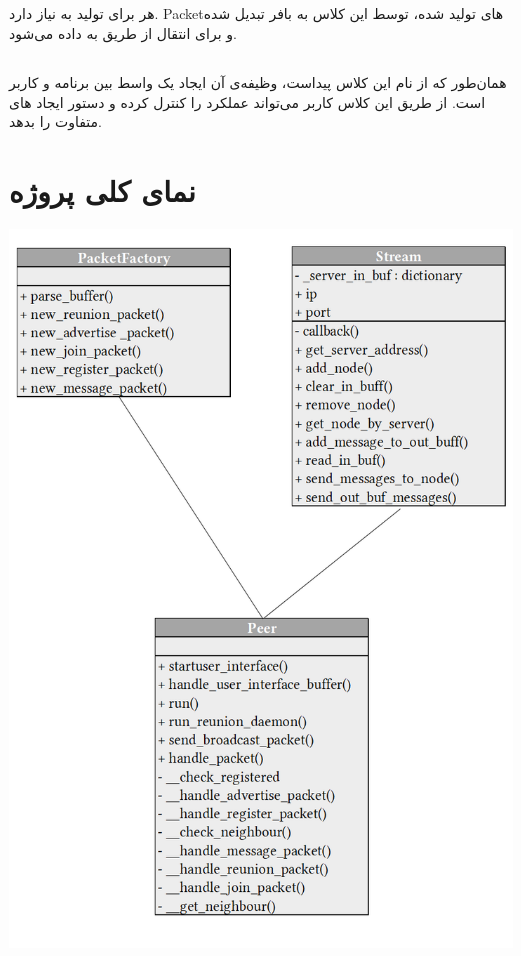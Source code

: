 \documentclass{article}
\begin{document}
\subsection{}
هر  برای تولید  به  نیاز دارد. Packetهای تولید شده، توسط این کلاس به بافر تبدیل شده و برای انتقال از طریق  به  داده می‌شود.



\subsection{}
همان‌طور که از نام این کلاس پیداست، وظیفه‌ی آن ایجاد یک واسط بین برنامه و کاربر است. از طریق این کلاس کاربر می‌تواند عملکرد  را کنترل کرده و دستور ایجاد های متفاوت را بدهد.



\newpage
\section{نمای کلی پروژه}
	
\begin{center}
	\vspace*{2.5cm}
	\includegraphics[scale=0.9]{UML1}
\end{center}
\end{document}

